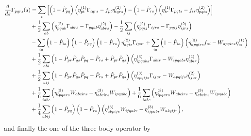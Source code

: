 \begin{align}
\frac{d}{ds}\Gamma_{pqrs}(s) &= \sum_t \left[ \lb 1-\hat{P}_{pq} \rb \lb \eta_{pt}^{(1)}\Gamma_{tqrs} - f_{pt}\eta_{tqrs}^{(2)} \rb - \lb 1-\hat{P}_{rs}\rb \lb \eta_{tr}^{(1)} \Gamma_{pqts} - f_{tr} \eta_{pqts}^{(2)} \rb \right] \notag \\
& + \frac{1}{2}\sum_{ab}\lb \eta_{pqab}^{(2)}\Gamma_{abrs} - \Gamma_{pqab}\eta_{abrs}^{(2)}\rb - 
\frac{1}{2}\sum_{ij}\lb \eta_{pqij}^{(2)}\Gamma_{ijrs} - \Gamma_{pqij}\eta_{ijrs}^{(2)}\rb \notag \\
& -\sum_{ia} \lb 1- \hat{P}_{ia} \rb \lb 1-\hat{P}_{pq}\rb \lb 1-\hat{P}_{rs} \rb \eta_{aqis}^{(2)}\Gamma_{ipar} + \sum_{ia} \lb 1- \hat{P}_{ia} \rb \lb \eta_{apqirs}^{(3)} f_{ai} - W_{apqirs} \eta_{ai}^{(1)} \rb \notag \\
& + \frac{1}{2}\sum_{abi} \lb 1 - \hat{P}_{pr}\hat{P}_{qs}\hat{P}_{pq} - \hat{P}_{rs} + \hat{P}_{pr}\hat{P}_{qs} \rb \lb \eta_{ipqabs}^{(3)}\Gamma_{abir} - W_{ipqabs} \eta_{abir}^{(2)} \rb \notag \\
& + \frac{1}{2}\sum_{aij} \lb 1 - \hat{P}_{pr}\hat{P}_{qs}\hat{P}_{pq} - \hat{P}_{rs} + \hat{P}_{pr}\hat{P}_{qs} \rb \lb \eta_{apqijs}^{(3)}\Gamma_{ijar} - W_{apqijs} \eta_{ijar}^{(2)} \rb \notag \\
& + \frac{1}{6} \sum_{iabc}\lb \eta_{ipqars}^{(3)} W_{abcirs} - \eta_{abcirs}^{(3)} W_{ipqabc} \rb
+ \frac{1}{6} \sum_{iabc}\lb \eta_{ipqars}^{(3)} W_{abcirs} - \eta_{abcirs}^{(3)} W_{ipqabc} \rb \notag \\
& + \frac{1}{4}\sum_{abij}\lb 1 - \hat{P}_{pq} \rb \lb 1 - \hat{P}_{rs} \rb \lb \eta_{abpijs}^{(3)} W_{ijqabr} - \eta_{ijpabs}^{(3)} W_{abqijr} \rb, 
\label{eq:flow2}
\end{align}
and finally the one of the three-body operator by
